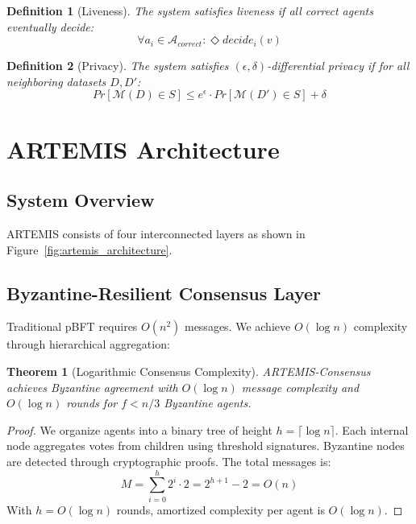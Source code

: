\documentclass[conference]{IEEEtran}
\newtheorem{theorem}{Theorem}
\newtheorem{definition}{Definition}
\begin{document}
\begin{definition}[Liveness]
The system satisfies liveness if all correct agents eventually decide:
\begin{equation}
\forall a_i \in \mathcal{A}_{correct}: \Diamond decide_i(v)
\end{equation}
\end{definition}

\begin{definition}[Privacy]
The system satisfies $(\epsilon, \delta)$-differential privacy if for all neighboring datasets $D, D'$:
\begin{equation}
Pr[\mathcal{M}(D) \in S] \leq e^\epsilon \cdot Pr[\mathcal{M}(D') \in S] + \delta
\end{equation}
\end{definition}

\section{ARTEMIS Architecture}

\subsection{System Overview}

ARTEMIS consists of four interconnected layers as shown in Figure~\ref{fig:artemis_architecture}.



\subsection{Byzantine-Resilient Consensus Layer}

Traditional pBFT requires $O(n^2)$ messages. We achieve $O(\log n)$ complexity through hierarchical aggregation:

\begin{theorem}[Logarithmic Consensus Complexity]
ARTEMIS-Consensus achieves Byzantine agreement with $O(\log n)$ message complexity and $O(\log n)$ rounds for $f < n/3$ Byzantine agents.
\end{theorem}

\begin{proof}
We organize agents into a binary tree of height $h = \lceil \log n \rceil$. Each internal node aggregates votes from children using threshold signatures. Byzantine nodes are detected through cryptographic proofs. The total messages is:
\begin{equation}
M = \sum_{i=0}^{h} 2^i \cdot 2 = 2^{h+1} - 2 = O(n)
\end{equation}
With $h = O(\log n)$ rounds, amortized complexity per agent is $O(\log n)$.
\end{proof}
\end{document}
